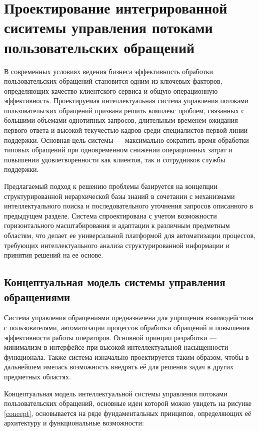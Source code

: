 \section{Проектирование интегрированной сиситемы управления потоками пользовательских обращений}
\label{sec:designing}

В современных условиях ведения бизнеса эффективность обработки пользовательских обращений становится одним из ключевых факторов, определяющих качество клиентского сервиса и общую операционную эффективность. Проектируемая интеллектуальная система управления потоками пользовательских обращений призвана решить комплекс проблем, связанных с большими объемами однотипных запросов, длительным временем ожидания первого ответа и высокой текучестью кадров среди специалистов первой линии поддержки. Основная цель системы — максимально сократить время обработки типовых обращений при одновременном снижении операционных затрат и повышении удовлетворенности как клиентов, так и сотрудников службы поддержки.

Предлагаемый подход к решению проблемы базируется на концепции структурированной иерархической базы знаний в сочетании с механизмами интеллектуального поиска и последовательного уточнения запросов описанного в предыдущем разделе. Система спроектирована с учетом возможности горизонтального масштабирования и адаптации к различным предметным областям, что делает ее универсальной платформой для автоматизации процессов, требующих интеллектуального анализа структурированной информации и принятия решений на ее основе.

\subsection{Концептуальная модель системы управления обращениями}

Система управления обращениями предназначена для упрощения взаимодействия с пользователями, автоматизации процессов обработки обращений и повышения эффективности работы операторов. Основной принцип разработки — минимализм в интерфейсе при высокой интеллектуальной насыщенности функционала. Также система изначально проектируется таким образом, чтобы в дальнейшем имелась возможность внедрять её для решения задач в других предметных областях.

Концептуальная модель интеллектуальной системы управления потоками пользовательских обращений, основные идеи которой можно увидеть на рисунке \ref{concept}, основывается на ряде фундаментальных принципов, определяющих её архитектуру и функциональные возможности:

